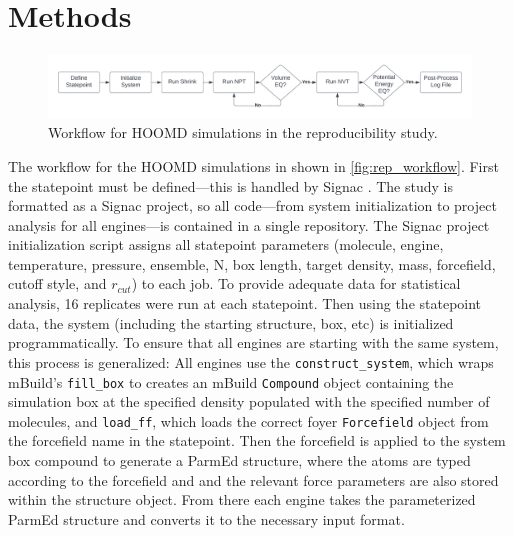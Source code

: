 \section{Methods}

\begin{figure}[h!]
    \centering
    \includegraphics[width=\linewidth,keepaspectratio]{figures/rep_study/reproducibility_workflow.png}
    \caption{Workflow for HOOMD simulations in the reproducibility study.}\label{fig:rep_workflow}
\end{figure}
The workflow for the HOOMD simulations in shown in \autoref{fig:rep_workflow}. 
First the statepoint must be defined---this is handled by Signac \cite{Adorf2018, signac_zenodo, signac_scipy_2018, signac_scipy_2021}. 
The study is formatted as a Signac project, so all code---from system initialization to project analysis for all engines---is contained in a single repository.
The Signac project initialization script assigns all statepoint parameters (molecule, engine, temperature, pressure, ensemble, N, box length, target density, mass, forcefield, cutoff style, and $r_{cut}$) to each job. 
To provide adequate data for statistical analysis, 16 replicates were run at each statepoint.
Then using the statepoint data, the system (including the starting structure, box, etc) is initialized programmatically.
To ensure that all engines are starting with the same system, this process is generalized: All engines use the \lstinline{construct_system}, which wraps mBuild's \lstinline{fill_box} to creates an mBuild \lstinline{Compound} object containing the simulation box at the specified density populated with the specified number of molecules, and \lstinline{load_ff}, which loads the correct foyer \lstinline{Forcefield} object from the forcefield name in the statepoint. 
Then the forcefield is applied to the system box compound to generate a ParmEd structure\cite{Shirts2017}, where the atoms are typed according to the forcefield and and the relevant force parameters are also stored within the structure object. 
From there each engine takes the parameterized ParmEd structure and converts it to the necessary input format. 

